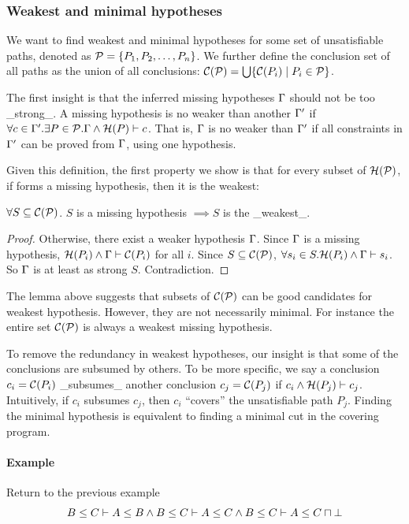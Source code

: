 \subsubsection{Weakest and minimal hypotheses}

We want to find weakest and minimal
hypotheses for some set of unsatisfiable paths, denoted as
$\mathcal{P}=\{P_1, P_2, \dots, P_n\}$. We further define the conclusion
set of all paths as the union of all conclusions:
$\mathcal{C}(\mathcal{P})=\bigcup\{\mathcal{C}(P_i) \mid P_i\in \mathcal{P}\}$.

The first insight is that the inferred missing hypotheses $\Gamma$ should
not be too _strong_. A missing hypothesis is no weaker
than another $\Gamma'$ if $\forall c\in \Gamma'.\exists P\in \mathcal{P}.  \Gamma
\land \mathcal{H}(P) \vdash c$. That is, $\Gamma$ is no weaker than
$\Gamma'$ if all constraints in $\Gamma'$ can be proved from $\Gamma$,
using one hypothesis.

Given this definition, the first property we show is that for every
subset of $\mathcal{H}(\mathcal{P})$, if forms a missing hypothesis, then it
is the weakest:
%
\begin{Lemma}
\label{lemma:weakest}
$\forall S\subseteq \mathcal{C}(\mathcal{P})$. $S$ is a missing hypothesis
$\implies S$ is the _weakest_.
\end{Lemma}
\begin{proof}
Otherwise, there exist a weaker hypothesis $\Gamma$. Since $\Gamma$ is a
missing hypothesis, $\mathcal{H}(P_i) \land \Gamma\vdash \mathcal{C}(P_i)$  for
all $i$. Since $S\subseteq \mathcal{C}(\mathcal{P})$, $\forall s_i\in S.
\mathcal{H}(P_i) \land \Gamma\vdash s_i$. So $\Gamma$ is at least as strong $S$.
Contradiction.
\end{proof}
%
%
The lemma above suggests that subsets of $\mathcal{C}(\mathcal{P})$ can be
good candidates for weakest hypothesis. However, they are not
necessarily minimal. For instance the entire set $\mathcal{C}(\mathcal{P})$
is always a weakest missing hypothesis. 

To remove the redundancy in weakest hypotheses, our insight is that
some of the conclusions are subsumed by others. 
%
To be more specific, we say a conclusion $c_i=\mathcal{C}(P_i)$
_subsumes_ another conclusion $c_j=\mathcal{C}(P_j)$ if $c_i \land
\mathcal{H}(P_j) \vdash c_j$. Intuitively, if $c_i$ subsumes $c_j$, then
$c_i$ ``covers'' the unsatisfiable path $P_j$. Finding the minimal
hypothesis is equivalent to finding a minimal cut in the covering
program.

\paragraph{Example} Return to the previous example \[B\leq C \vdash
A\leq B \land B\leq C \vdash A\leq C \land B\leq C \vdash A\leq
C\sqcap \bot \]

